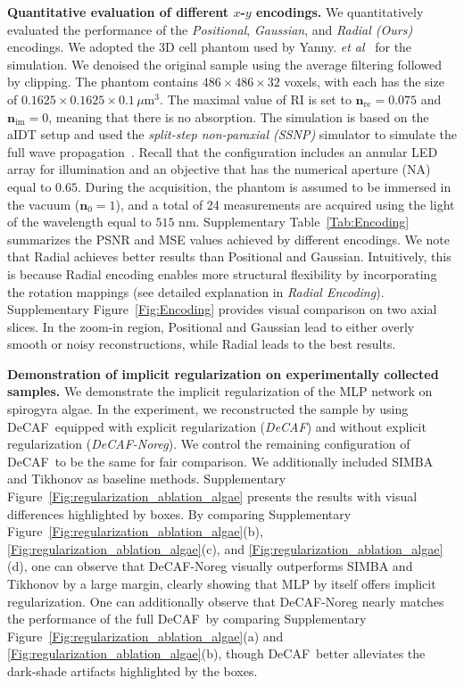 \documentclass[11pt]{article}
\theoremstyle{plain} %
\def\proposed{DeCAF}
\def\nbm{{\bm{n}}}
\begin{document}
\vspace{0.5em}
\noindent
\textbf{Quantitative evaluation of different $x$-$y$ encodings.} We quantitatively evaluated the performance of the \emph{Positional}, \emph{Gaussian}, and \emph{Radial (Ours)} encodings.  We adopted the 3D cell phantom used by Yanny. \emph{et al}~\cite{Yanny.etal2022} for the simulation. We denoised the original sample using the average filtering followed by clipping. 
The phantom contains $486\times486\times32$ voxels, with each has the size of $0.1625\times0.1625\times0.1\,\mu\text{m}^3$.
The maximal value of RI is set to $\nbm_\text{re} = 0.075$ and $\nbm_\text{im} = 0$, meaning that there is no absorption.
The simulation is based on the aIDT setup and used the \emph{split-step non-paraxial (SSNP)} simulator to simulate the full wave propagation~\cite{Lim.etal2019}. Recall that the configuration includes an annular LED array for illumination and an objective that has the numerical aperture (NA) equal to $0.65$.
During the acquisition, the phantom is assumed to be immersed in the vacuum ($\nbm_0=1$), and a total of 24 measurements are acquired using the light of the wavelength equal to $515$ nm.
Supplementary Table~\ref{Tab:Encoding} summarizes the PSNR and MSE values achieved by different encodings.
We note that Radial achieves better results than Positional and Gaussian. Intuitively, this is because Radial encoding enables more structural flexibility by incorporating the rotation mappings (see detailed explanation in \emph{Radial Encoding}).
Supplementary Figure~\ref{Fig:Encoding} provides visual comparison on two axial slices. In the zoom-in region, Positional and Gaussian lead to either overly smooth or noisy reconstructions, while Radial leads to the best results. 

\vspace{0.5em}
\noindent
\textbf{Demonstration of implicit regularization on experimentally collected samples.} We demonstrate the implicit regularization of the MLP network on spirogyra algae.
In the experiment, we reconstructed the sample by using \proposed~equipped with explicit regularization (\emph{\proposed}) and without explicit regularization (\emph{\proposed-Noreg}).
We control the remaining configuration of \proposed~to be the same for fair comparison. 
We additionally included SIMBA and Tikhonov as baseline methods.
Supplementary Figure~\ref{Fig:regularization_ablation_algae} presents the results with visual differences highlighted by boxes. 
By comparing Supplementary Figure~\ref{Fig:regularization_ablation_algae}(b), \ref{Fig:regularization_ablation_algae}(c), and \ref{Fig:regularization_ablation_algae}(d), one can observe that \proposed-Noreg visually outperforms SIMBA and Tikhonov by a large margin, clearly showing that MLP by itself offers implicit regularization.
One can additionally observe that \proposed-Noreg nearly matches the performance of the full \proposed~by comparing Supplementary Figure~\ref{Fig:regularization_ablation_algae}(a) and \ref{Fig:regularization_ablation_algae}(b), though \proposed~better alleviates the dark-shade artifacts highlighted by the boxes.
\end{document}
